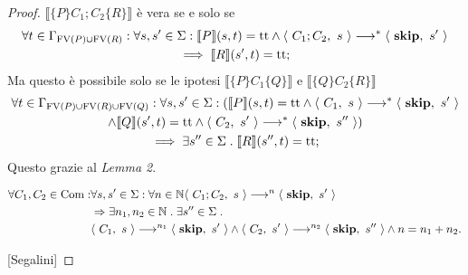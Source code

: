 \begin{teorema}
\begin{proof}
$\bigl \llbracket \{P\} C_1;C_2\{R\} \bigr \rrbracket$ è vera se e solo se
\begin{multline*}
    \forall t \in \Gamma_{\mathrm{FV}(P)\cup\mathrm{FV}(R)}\mathrel{:}
      \forall s,s'\in \Sigma \mathrel{:} \llbracket P \rrbracket(s,t) = \mathrm{tt}
       \land \langle\ C_1;C_2,\ s\ \rangle \longrightarrow^* \langle\ \mathop{\textup{\textbf{skip}}},\ s'\ \rangle\\
        \implies \llbracket R \rrbracket(s',t)=\mathrm{tt};
\end{multline*}
Ma questo è possibile solo se le ipotesi $\bigl \llbracket \{P\}C_1\{Q\} \bigr \rrbracket$ e $\bigl \llbracket \{Q\}C_2\{R\} \bigr \rrbracket$ 
\begin{multline*}
      \forall t \in \Gamma_{\mathrm{FV}(P)\cup\mathrm{FV}(R)\cup\mathrm{FV}(Q)}\mathrel{:}
      \forall s,s'\in \Sigma \mathrel{:}      
      (\llbracket P \rrbracket(s,t) = \mathrm{tt} 
         \land \langle\ C_1,\ s\ \rangle \longrightarrow^* \langle\ \mathop{\textup{\textbf{skip}}},\ s'\ \rangle \\
         \land \llbracket Q \rrbracket(s',t) = \mathrm{tt}
         \land \langle\ C_2,\ s'\ \rangle \longrightarrow^* \langle\ \mathop{\textup{\textbf{skip}}},\ s''\ \rangle)\\
      \implies \exists s'' \in \Sigma \mathrel{.} \llbracket R \rrbracket(s'',t) = \mathrm{tt};
\end{multline*}
Questo grazie al \textit{Lemma 2}.
\begin{lemma}
\begin{align*}
   \forall C_1,C_2 \in \mathrm{Com} \mathrel{:} 
   &\forall s,s' \in \Sigma \mathrel{:} \forall n \in \mathbb{N} \langle\ C_1;C_2,\ s\ \rangle \longrightarrow ^n\langle\ \mathop{\textup{\textbf{skip}}},\ s'\ \rangle \\
   &\Rightarrow \exists n_1,n_2 \in \mathbb{N} \mathrel{.} \exists s'' \in \Sigma \mathrel{.} \\
   &\langle\ C_1,\ s\ \rangle \longrightarrow ^{n_1}\langle\ \mathop{\textup{\textbf{skip}}},\ s'\ \rangle \land \langle\ C_2,\ s'\ \rangle \longrightarrow ^{n_2}\langle\ \mathop{\textup{\textbf{skip}}},\ s''\ \rangle
   \land n = n_1 + n_2.
\end{align*}
\end{lemma}
[Segalini]
\end{proof}
\end{teorema}